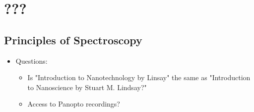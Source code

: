 \documentclass[../notes.tex]{subfiles}
\begin{document}
\chapter{???}
\section{Principles of Spectroscopy}
\begin{itemize}
    \item {}Questions:
    \begin{itemize}
        \item Is "Introduction to Nanotechnology by Linsay" the same as "Introduction to Nanoscience by Stuart M. Lindsay?"
        \item Access to Panopto recordings?
    \end{itemize}
\end{itemize}
\end{document}
